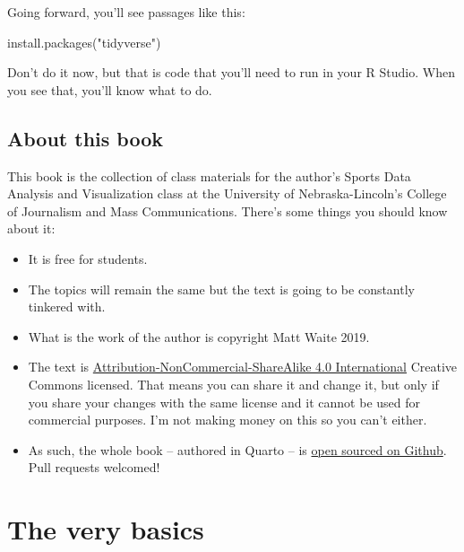 \documentclass[
  letterpaper,
  DIV=11,
  numbers=noendperiod]{scrreprt}
\newenvironment{Shaded}{\begin{snugshade}}{\end{snugshade}}
\newcommand{\FunctionTok}[1]{\textcolor[rgb]{0.28,0.35,0.67}{#1}}
\newcommand{\NormalTok}[1]{\textcolor[rgb]{0.00,0.23,0.31}{#1}}
\newcommand{\StringTok}[1]{\textcolor[rgb]{0.13,0.47,0.30}{#1}}
\providecommand{\tightlist}{%
  \setlength{\itemsep}{0pt}\setlength{\parskip}{0pt}}\usepackage{longtable,booktabs,array}
\begin{document}
Going forward, you'll see passages like this:

\begin{Shaded}
\begin{Highlighting}[]
\FunctionTok{install.packages}\NormalTok{(}\StringTok{"tidyverse"}\NormalTok{)}
\end{Highlighting}
\end{Shaded}

Don't do it now, but that is code that you'll need to run in your R
Studio. When you see that, you'll know what to do.

\hypertarget{about-this-book}{%
\section{About this book}\label{about-this-book}}

This book is the collection of class materials for the author's Sports
Data Analysis and Visualization class at the University of
Nebraska-Lincoln's College of Journalism and Mass Communications.
There's some things you should know about it:

\begin{itemize}
\tightlist
\item
  It is free for students.
\item
  The topics will remain the same but the text is going to be constantly
  tinkered with.
\item
  What is the work of the author is copyright Matt Waite 2019.
\item
  The text is
  \href{https://creativecommons.org/licenses/by-nc-sa/4.0/}{Attribution-NonCommercial-ShareAlike
  4.0 International} Creative Commons licensed. That means you can share
  it and change it, but only if you share your changes with the same
  license and it cannot be used for commercial purposes. I'm not making
  money on this so you can't either.
\item
  As such, the whole book -- authored in Quarto -- is
  \href{https://github.com/mattwaite/sportsdatabook}{open sourced on
  Github}. Pull requests welcomed!
\end{itemize}


\hypertarget{the-very-basics}{%
\chapter{The very basics}\label{the-very-basics}}
\end{document}
